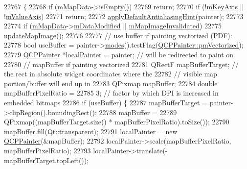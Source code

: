 \begin{DoxyCode}
22767                                           \{
22768   \textcolor{keywordflow}{if} (\hyperlink{class_q_c_p_color_map_a8709272aa8f0be3ca111bf3866806f8b}{mMapData}->\hyperlink{class_q_c_p_color_map_data_a986009324aee1fc5f696db46bd03dde5}{isEmpty}())
22769     \textcolor{keywordflow}{return};
22770   \textcolor{keywordflow}{if} (!\hyperlink{class_q_c_p_abstract_plottable_a426f42e254d0f8ce5436a868c61a6827}{mKeyAxis} || !\hyperlink{class_q_c_p_abstract_plottable_a2901452ca4aea911a1827717934a4bda}{mValueAxis})
22771     \textcolor{keywordflow}{return};
22772   \hyperlink{class_q_c_p_abstract_plottable_a76e9d6cc7972dc1528f526d163766aca}{applyDefaultAntialiasingHint}(painter);
22773 
22774   \textcolor{keywordflow}{if} (\hyperlink{class_q_c_p_color_map_a8709272aa8f0be3ca111bf3866806f8b}{mMapData}->\hyperlink{class_q_c_p_color_map_data_ad3cc682da2ac14e5acdbc05cf4d3d93b}{mDataModified} || \hyperlink{class_q_c_p_color_map_ac9aea6a5c193d7fa866bc7b26e79ef2c}{mMapImageInvalidated})
22775     \hyperlink{class_q_c_p_color_map_a5efcea591bb5486d968af520a4d43c3a}{updateMapImage}();
22776 
22777   \textcolor{comment}{// use buffer if painting vectorized (PDF):}
22778   \textcolor{keywordtype}{bool} useBuffer = painter->\hyperlink{class_q_c_p_painter_a99b89eaf5363faaa1e1e6162856f436c}{modes}().testFlag(\hyperlink{class_q_c_p_painter_a156cf16444ff5e0d81a73c615fdb156daeda679cd55dcd468341d07d48a30b6ab}{QCPPainter::pmVectorized});
22779   \hyperlink{class_q_c_p_painter}{QCPPainter} *localPainter = painter; \textcolor{comment}{// will be redirected to paint on}
22780                                       \textcolor{comment}{// mapBuffer if painting vectorized}
22781   QRectF mapBufferTarget; \textcolor{comment}{// the rect in absolute widget coordinates where the}
22782                           \textcolor{comment}{// visible map portion/buffer will end up in}
22783   QPixmap mapBuffer;
22784   \textcolor{keywordtype}{double} mapBufferPixelRatio =
22785       3; \textcolor{comment}{// factor by which DPI is increased in embedded bitmaps}
22786   \textcolor{keywordflow}{if} (useBuffer) \{
22787     mapBufferTarget = painter->clipRegion().boundingRect();
22788     mapBuffer =
22789         QPixmap((mapBufferTarget.size() * mapBufferPixelRatio).toSize());
22790     mapBuffer.fill(Qt::transparent);
22791     localPainter = \textcolor{keyword}{new} \hyperlink{class_q_c_p_painter}{QCPPainter}(&mapBuffer);
22792     localPainter->scale(mapBufferPixelRatio, mapBufferPixelRatio);
22793     localPainter->translate(-mapBufferTarget.topLeft());

\end{DoxyCode}
